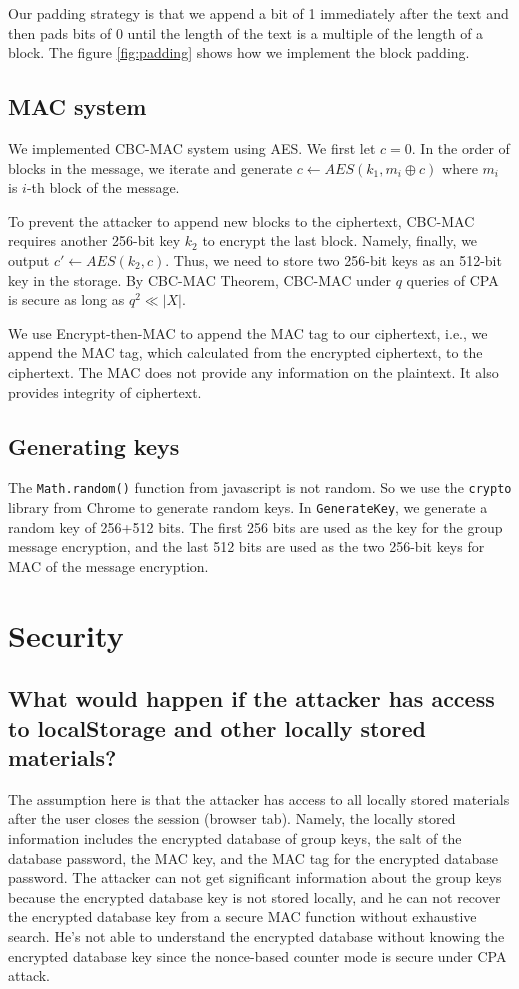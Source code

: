 Our padding strategy is that we append a bit of 1 immediately after the text and then pads bits of 0 until the length of the text is a multiple of the length of a block. The figure \ref{fig:padding} shows how we implement the block padding. 

\subsection{MAC system}
We implemented CBC-MAC system using AES. 
We first let $c = 0$. In the order of blocks in the message, we iterate and generate $c \gets AES(k_1, m_i \oplus c)$ where $m_i$ is $i$-th block of the message. 

To prevent the attacker to append new blocks to the ciphertext, CBC-MAC requires another 256-bit key $k_2$ to encrypt the last block. Namely, finally, we output $c' \gets AES(k_2, c)$. Thus, we need to store two 256-bit keys as an 512-bit key in the storage. 
By CBC-MAC Theorem, CBC-MAC under $q$ queries of CPA is secure as long as  $q^2 \ll |X|$.

We use Encrypt-then-MAC to append the MAC tag to our ciphertext, i.e., we append the MAC tag, which calculated from the encrypted ciphertext, to the ciphertext. 
The MAC does not provide any information on the plaintext. It also provides integrity of ciphertext. 

\subsection{Generating keys}
The \texttt{Math.random()} function from javascript is not random. So we use the \texttt{crypto} library from Chrome to generate random keys. In \texttt{GenerateKey}, we generate a random key of 256+512 bits. The first 256 bits are used as the key for the group message encryption, and the last 512 bits are used as the two 256-bit keys for MAC of the message encryption. 

\section{Security}
\subsection{What would happen if the attacker has access to localStorage and other locally stored materials? }
The assumption here is that the attacker has access to all locally stored materials after the user closes the session (browser tab). Namely, the locally stored information includes the encrypted database of  group keys, the salt of the database password, the MAC key, and the MAC tag for the encrypted database password. The attacker can not get significant information about the group keys because the encrypted database key is not stored locally, and he can not recover the encrypted database key from a secure MAC function without exhaustive search. He's not able to understand the encrypted database without knowing the encrypted database key since the nonce-based counter mode is secure under CPA attack. 

